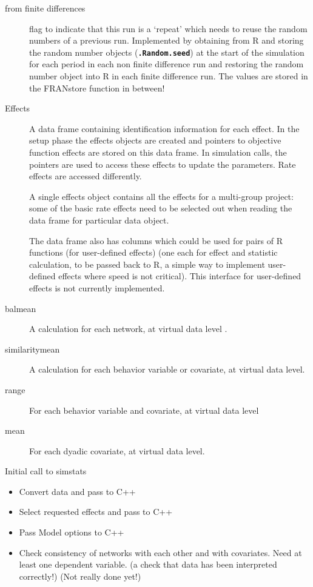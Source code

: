 \documentclass[12pt,a4paper]{article}
\makeatletter
\renewcommand{\=}{\,=\,}
\newcommand{\+}{\,+\,}
\newcommand{\nm}[1]{\textsf{\small #1}}
\newcommand{\R}{{\sf R }}
\newcommand{\sfn}[1]{\textbf{\texttt{#1}}}
\renewcommand{\section}{\@startsection{section}{1}
                {0pt}{\baselineskip}{0.5\baselineskip}
                {\centering\sffamily} }
\makeatother
\begin{document}
\begin{description}
\item[from finite differences] flag to indicate that this run is a `repeat'
  which needs to reuse the random numbers of a previous run. Implemented by
  obtaining from \R and storing the random number objects (\sfn{.Random.seed})
  at the start of the simulation for each period in each non finite difference
  run and restoring the random number object into \R in each finite difference
  run. The values are stored in the \nm{FRANstore} function in between!
\item [Effects] A data frame containing identification information for
  each effect. In the setup phase the effects objects are created and pointers
  to objective function effects are stored on this data frame. In simulation
  calls, the pointers are used to access these effects to update the
  parameters. Rate effects are accessed differently.

  A single effects object contains all the effects for a multi-group project:
  some of the basic rate effects need to be selected out when reading the data
  frame for particular data object.

  The data frame also has columns which could be used for pairs of R functions
  (for user-defined effects) (one each for effect and statistic calculation, to
  be passed back to R, a simple way to implement user-defined effects where
  speed is not critical). This interface for user-defined effects is not
  currently implemented.
\item[balmean] A calculation for each network, at virtual data level .
\item[similaritymean] A calculation for each behavior variable or covariate, at
  virtual data level.
\item[range] For each behavior variable and covariate, at virtual data level
\item[mean] For each dyadic covariate, at virtual data level.
\end{description}
\section{Initial call to simstats}
\begin{itemize}
\item Convert data and pass to C++
\item Select requested effects and pass to C++
\item Pass Model options to C++
\item Check consistency of networks with each other and with covariates. Need at
  least one dependent variable. (a check that data has been interpreted
  correctly!) (Not really done yet!)
\end{itemize}
\end{document}

